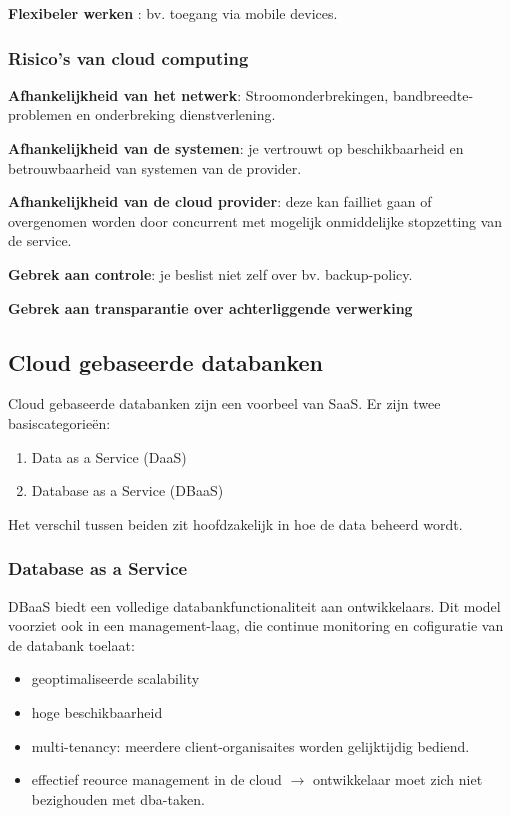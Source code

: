 \documentclass[a4paper,12pt]{article}
\begin{document}
\textbf{Flexibeler werken} : bv. toegang via mobile devices.

\subsubsection{Risico's van cloud computing}
\textbf{Afhankelijkheid van het netwerk}: Stroomonderbrekingen, bandbreedte-problemen en onderbreking dienstverlening.

\textbf{Afhankelijkheid van de systemen}: je vertrouwt op beschikbaarheid en betrouwbaarheid van systemen van de provider.

\textbf{Afhankelijkheid van de cloud provider}: deze kan failliet gaan of overgenomen worden door concurrent met mogelijk onmiddelijke stopzetting van de service.

\textbf{Gebrek aan controle}: je beslist niet zelf over bv. backup-policy.

\textbf{Gebrek aan transparantie over achterliggende verwerking}

\subsection{Cloud gebaseerde databanken}
Cloud gebaseerde databanken zijn een voorbeel van SaaS.
Er zijn twee basiscategorieën:
\begin{enumerate}
\item Data as a Service (DaaS)
\item Database as a Service (DBaaS)
\end{enumerate}
Het verschil tussen beiden zit hoofdzakelijk in hoe de data beheerd wordt.

\subsubsection{Database as a Service}
DBaaS biedt een volledige databankfunctionaliteit aan ontwikkelaars. Dit model voorziet ook in een management-laag, die continue monitoring en cofiguratie van de databank toelaat:
\begin{itemize}
\item geoptimaliseerde scalability
\item hoge beschikbaarheid
\item multi-tenancy: meerdere client-organisaites worden gelijktijdig bediend.
\item effectief reource management in de cloud $\rightarrow$ ontwikkelaar moet zich niet bezighouden met dba-taken.
\end{itemize}
\end{document}
